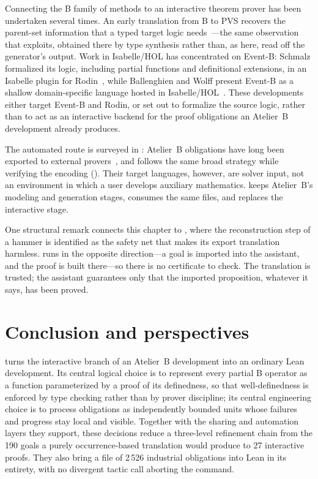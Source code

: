 Connecting the B family of methods to an interactive theorem prover has been undertaken
several times.
An early translation from B to PVS recovers the parent-set information that a typed target
logic needs~\cite{Bodeveix2002BtoPVS}---the same observation that
 exploits, obtained there by type synthesis rather than, as
here, read off the generator's output.
Work in Isabelle/HOL has concentrated on Event-B: Schmalz formalized its logic, including
partial functions and definitional extensions, in an Isabelle plugin for
Rodin~\cite{Schmalz2012RodinIsabelle}, while Ballenghien and Wolff present Event-B as a
shallow domain-specific language hosted in Isabelle/HOL~\cite{Wolff2024EB_Isabelle}.
These developments either target Event-B and Rodin, or set out to formalize the source
logic, rather than to act as an interactive backend for the proof obligations an Atelier~B
development already produces.

The automated route is surveyed in : Atelier~B obligations
have long been exported to external provers~\cite{mentre2012discharging,deharbe2010automatic},
and \beer{} follows the same broad strategy while verifying the encoding
().
Their target languages, however, are solver input, not an environment in which a user
develops auxiliary mathematics.
\barrel{} keeps Atelier~B's modeling and generation stages, consumes the same files, and
replaces the interactive stage.

One structural remark connects this chapter to , where the
reconstruction step of a hammer is identified as the safety net that makes its export
translation harmless.
\barrel{} runs in the opposite direction---a goal is imported into the assistant, and the
proof is built there---so there is no certificate to check.
The translation is trusted; the assistant guarantees only that the imported proposition,
whatever it says, has been proved.

\section{Conclusion and perspectives}
\label{sec:barrel-discussion}

\barrel{} turns the interactive branch of an Atelier~B development into an ordinary Lean
development.
Its central logical choice is to represent every partial B operator as a function
parameterized by a proof of its definedness, so that well-definedness is enforced by type
checking rather than by prover discipline; its central engineering choice is to process
obligations as independently bounded units whose failures and progress stay local and
visible.
Together with the sharing and automation layers they support, these decisions reduce a
three-level refinement chain from the 190 goals a purely occurrence-based translation would
produce to 27 interactive proofs.
They also bring a file of 2\,526 industrial obligations into Lean in its entirety, with no
divergent tactic call aborting the command.

